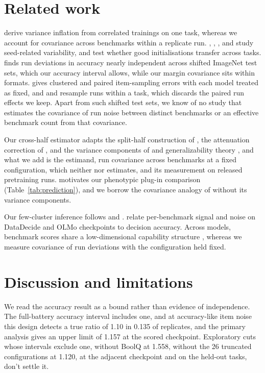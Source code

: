 \section{Related work}
\citet{bouthillier2021} derive variance inflation from correlated trainings on one task, whereas we account for covariance across benchmarks within a replicate run. \citet{reimers2017}, \citet{zhou2020}, \citet{madaan2024}, and \citet{fehlauer2025} study seed-related variability, and \citet{dodge2020} test whether good initialisations transfer across tasks. \citet{jordan2024} finds run deviations in accuracy nearly independent across shifted ImageNet test sets, which our accuracy interval allows, while our margin covariance sits within formats. \citet{miller2024} gives clustered and paired item-sampling errors with each model treated as fixed, and \citet{henderson2018} and \citet{agarwal2021} resample runs within a task, which discards the paired run effects we keep. Apart from such shifted test sets, we know of no study that estimates the covariance of run noise between distinct benchmarks or an effective benchmark count from that covariance.

Our cross-half estimator adapts the split-half construction of \citet{spearman1910,brown1910}, the attenuation correction of \citet{spearman1904}, and the variance components of \citet{searle1992} and generalizability theory \citep{brennan2001}, and what we add is the estimand, run covariance across benchmarks at a fixed configuration, which neither \citet{miller2024} nor \citet{heineman2025} estimates, and its measurement on released pretraining runs. \citet{cheverud1988} motivates our phenotypic plug-in comparison (Table~\ref{tab:prediction}), and we borrow the covariance analogy of \citet{martin1977} without its variance components.

Our few-cluster inference follows \citet{cameron2008} and \citet{mackinnon2017}. \citet{heineman2025} relate per-benchmark signal and noise on DataDecide and OLMo checkpoints to decision accuracy. Across models, benchmark scores share a low-dimensional capability structure \citep{ruan2024,burnell2023revealing}, whereas we measure covariance of run deviations with the configuration held fixed.

\section{Discussion and limitations}
We read the accuracy result as a bound rather than evidence of independence. The full-battery accuracy interval includes one, and at accuracy-like item noise this design detects a true ratio of 1.10 in 0.135 of replicates, and the primary analysis gives an upper limit of 1.157 at the scored checkpoint. Exploratory cuts whose intervals exclude one, without BoolQ at 1.558, without the 26 truncated configurations at 1.120, at the adjacent checkpoint and on the held-out tasks, don't settle it.

